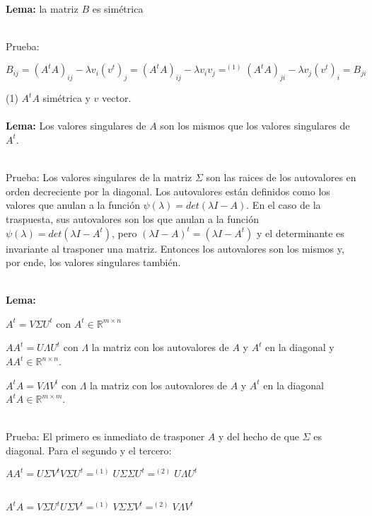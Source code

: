 \ \\
\textbf{Lema:} la matriz $B$ es simétrica

\ \\
Prueba:

\begin{center}
  $B_{ij} = (A^t A)_{ij} - \lambda v_i (v^t)_j = (A^t A)_{ij} - \lambda v_i v_j =^{(1)} (A^t A)_{ji}
  - \lambda v_j (v^t)_i = B_{ji}$
\end{center}

(1) $A^t A$ simétrica y $v$ vector.
\ \\


\ \\
\textbf{Lema:} Los valores singulares de $A$ son los mismos que los valores singulares de $A^t$.

\ \\
Prueba: Los valores singulares de la matriz $\Sigma$ son las raices de los autovalores en orden
decreciente por la diagonal. Los autovalores están definidos como los valores que anulan a la
función
$\psi(\lambda) = det(\lambda I - A)$. En el caso de la traspuesta, sus autovalores son los que
anulan a la función $\psi(\lambda) = det(\lambda I - A^t)$, pero $(\lambda I - A)^t = (\lambda I -
A^t)$ y el determinante es invariante al trasponer una matriz. Entonces los autovalores son los
mismos y, por ende, los valores singulares también.


\ \\
\textbf{Lema:}
\begin{compactitem}
  \item $A^t = V \Sigma U^t$ con $A^t \in \mathbb{R}^{m \times n}$
  \item $A A^t = U \Lambda U^t$ con $\Lambda$ la matriz con los autovalores de $A$ y $A^t$ en
    la diagonal y $A A^t \in \mathbb{R}^{n \times n}$.
  \item $A^t A = V \Lambda V^t $ con $\Lambda$ la matriz con los autovalores de $A$ y $A^t$ en
    la diagonal $A^t A \in \mathbb{R}^{m \times m}$.
\end{compactitem}

\ \\
Prueba: El primero es inmediato de trasponer $A$ y del hecho de que $\Sigma$ es diagonal. Para el
segundo y el tercero:
\begin{center}
$A A^t = U \Sigma V^t V \Sigma U^t =^{(1)} U \Sigma \Sigma U^t =^{(2)} U \Lambda U^t$

\ \\
$A^t A = V \Sigma U^t U \Sigma V^t =^{(1)} V \Sigma \Sigma V^t =^{(2)} V \Lambda V^t$
\end{center}

